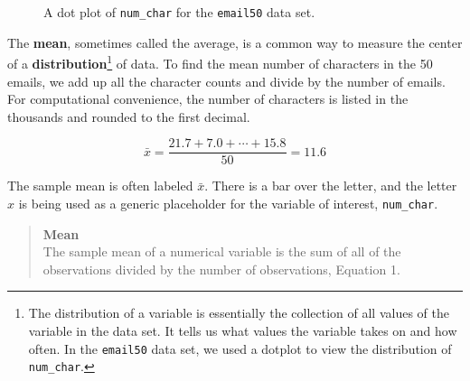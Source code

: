 \documentclass[
  letterpaper,
  DIV=11,
  numbers=noendperiod]{scrreprt}
\begin{document}
\begin{figure}


\caption{\label{fig-dot5}A dot plot of \texttt{num\_char} for the
\texttt{email50} data set.}

\end{figure}%

The \textbf{mean}, sometimes called the average, is a common way to
measure the center of a \textbf{distribution}\footnote{The distribution
  of a variable is essentially the collection of all values of the
  variable in the data set. It tells us what values the variable takes
  on and how often. In the \texttt{email50} data set, we used a dotplot
  to view the distribution of \texttt{num\_char}.} of data. To find the
mean number of characters in the 50 emails, we add up all the character
counts and divide by the number of emails. For computational
convenience, the number of characters is listed in the thousands and
rounded to the first decimal.

\[\bar{x} = \frac{21.7 + 7.0 + \cdots + 15.8}{50} = 11.6\]

The sample mean is often labeled \(\bar{x}\). There is a bar over the
letter, and the letter \(x\) is being used as a generic placeholder for
the variable of interest, \texttt{num\_char}.

\begin{quote}
\textbf{Mean}\\
The sample mean of a numerical variable is the sum of all of the
observations divided by the number of observations, Equation 1.
\end{quote}
\end{document}
